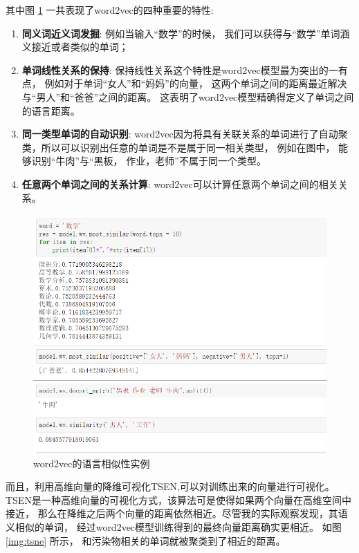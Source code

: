 其中图 \ref{img:word2vec_math} 一共表现了word2vec的四种重要的特性: 

\begin{enumerate}
\item{\textbf{同义词近义词发掘}}: 例如当输入“数学”的时候， 我们可以获得与“数学”单词涵义接近或者类似的单词；
\item{\textbf{单词线性关系的保持}}: 保持线性关系这个特性是word2vec模型最为突出的一有点， 例如对于单词“女人”和“妈妈”的向量， 这两个单词之间的距离最近解决与“男人”和“爸爸”之间的距离。 这表明了word2vec模型精确得定义了单词之间的语言距离。 
\item{\textbf{同一类型单词的自动识别}}: word2vec因为将具有关联关系的单词进行了自动聚类，所以可以识别出任意的单词是不是属于同一相关类型， 例如在图中， 能够识别“牛肉”与“黑板， 作业，老师”不属于同一个类型。
\item{\textbf{任意两个单词之间的关系计算}}: word2vec可以计算任意两个单词之间的相关关系。 
\end{enumerate}


\begin{figure}[htbp]
    \centering  %
    \includegraphics[width = .55\linewidth]{data/chapter-1-1/word2vec-math.png} %
    \caption{word2vec的语言相似性实例} %
    \label{img:word2vec_math} %
\end{figure}

而且，利用高维向量的降维可视化TSEN,可以对训练出来的向量进行可视化。 TSEN是一种高维向量的可视化方式，该算法可是使得如果两个向量在高维空间中接近， 那么在降维之后两个向量的距离依然相近。尽管我的实际观察发现，其语义相似的单词， 经过word2vec模型训练得到的最终向量距离确实更相近。 如图 \ref{img:tsne} 所示， 和污染物相关的单词就被聚类到了相近的距离。 


